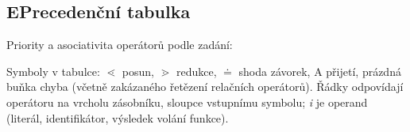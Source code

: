 \documentclass[11pt]{article}
\begin{document}
\subsection*{E\quad Precedenční tabulka}
\label{sec:prec-tab}
Priority a asociativita operátorů podle zadání:

\begin{center}

\end{center}

Symboly v tabulce: $\lessdot$ posun, $\gtrdot$ redukce, $\doteq$ shoda závorek, A přijetí, prázdná buňka chyba (včetně zakázaného řetězení relačních operátorů). Řádky odpovídají operátoru na vrcholu zásobníku, sloupce vstupnímu symbolu; \textit{i} je operand (literál, identifikátor, výsledek volání funkce).

\begin{center}

\end{center}
\end{document}
